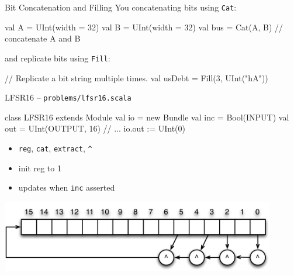 \documentclass[xcolor=pdflatex,dvipsnames,table]{beamer}
\begin{document}
% 
% 

\begin{frame}[fragile]{Bit Concatenation and Filling}
You concatenating bits using \verb+Cat+:
\begin{scala}
val A   = UInt(width = 32)
val B   = UInt(width = 32)
val bus = Cat(A, B) // concatenate A and B
\end{scala}

and replicate bits using \verb+Fill+:
\begin{scala}
// Replicate a bit string multiple times.
val usDebt = Fill(3, UInt("hA")) 
\end{scala}

\end{frame}

\begin{frame}[fragile]{LFSR16 -- \tt problems/lfsr16.scala}

\begin{scala}
class LFSR16 extends Module {
  val io = new Bundle {
    val inc = Bool(INPUT)
    val out = UInt(OUTPUT, 16)
  }
  // ...
  io.out := UInt(0)
}
\end{scala}
\begin{itemize}
\item \verb+reg+, \verb+cat+, \verb+extract+, \verb+^+
\item init reg to 1
\item updates when \verb+inc+ asserted
\end{itemize}

\begin{center}
\includegraphics[width=0.9\textwidth]{figs/LFSR16.pdf}
\end{center}

\end{frame}
\end{document}
